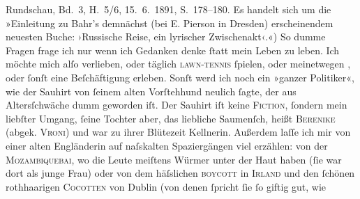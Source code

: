 \begin{ledgroupsized}[t]{13cm}
{{{{                        Rundschau}, Bd. 3, H. 5/6, 15. 6. 1891, S. 178–180.
                  Es handelt sich um die »Einleitung zu Bahr’s demnächst (bei E. Pierson
                     in Dresden) erscheinendem neuesten Buche:
                        ›Russische Reise, ein lyrischer
                        Zwischenakt‹.«}}}\label{K_L00023_5h})\pend
           \pstart
           So dumme Fragen frage ich nur wenn ich Gedanken denke ſtatt mein Leben zu leben. Ich
               möchte mich alſo verlieben, oder täglich \textsc{lawn-tennis}{ }ſpielen, oder meinetwegen \label{K_L00023_6v}\label{K_L00023_6h}, oder
               ſonſt eine Beſchäftigung erleben.\pend
           \pstart
           Sonſt werd ich noch ein »ganzer Politiker«, wie der Sauhirt von ſeinem alten Vorſtehhund neulich ſagte, der aus
               Altersſchwäche dumm geworden iſt. Der Sauhirt iſt keine \textsc{Fiction},
               ſondern mein liebſter Umgang, ſeine Tochter aber, das liebliche Saumenſch, heißt \textsc{Berenike} (abgek. \textsc{Vroni}) und war zu ihrer Blütezeit Kellnerin. Außerdem laſſe ich mir von einer alten
                  Engländerin auf naſskalten
               Spaziergängen viel erzählen: von der \textsc{Mozambiquebai}, wo die Leute meiſtens Würmer unter der Haut haben (ſie war dort als
               junge Frau) oder von dem häſslichen \textsc{boycott} in \textsc{Irland} und den ſchönen rothhaarigen \textsc{Cocotten} von Dublin (von denen ſpricht ſie ſo giftig gut, wie

\end{ledgroupsized}
